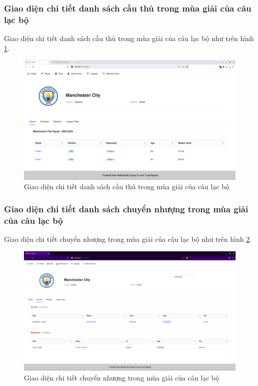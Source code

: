 \documentclass[../BTL.tex]{subfiles}
\begin{document}
\subsubsection{Giao diện chi tiết danh sách cầu thủ trong mùa giải của câu lạc bộ}
Giao diện chi tiết danh sách cầu thủ trong mùa giải của câu lạc bộ như trên hình \ref{fig:user-club-detail-squad}.
\begin{figure}
\centering
\includegraphics[width=1\linewidth]{Hinhve/user-club-detail-squad.png}
\caption{Giao diện chi tiết danh sách cầu thủ trong mùa giải của câu lạc bộ}
\label{fig:user-club-detail-squad}
\end{figure}

\subsubsection{Giao diện chi tiết danh sách chuyển nhượng trong mùa giải của câu lạc bộ}
Giao diện chi tiết chuyển nhượng trong mùa giải của câu lạc bộ như trên hình \ref{fig:user-club-detail-transfer}.
\begin{figure}
\centering
\includegraphics[width=1\linewidth]{Hinhve/user-club-detail-transfer.png}
\caption{Giao diện chi tiết chuyển nhượng trong mùa giải của câu lạc bộ}
\label{fig:user-club-detail-transfer}
\end{figure}
\end{document}
